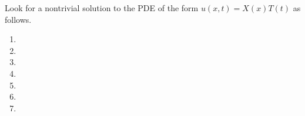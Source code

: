 Look for a nontrivial solution to the PDE of the form $u(x,t) = X(x)T(t)$ as follows.
\begin{enumerate}
\item 
\item \vspace{1in}
\item \newpage
\item \newpage
\item 
\item 
\item 
\end{enumerate}
